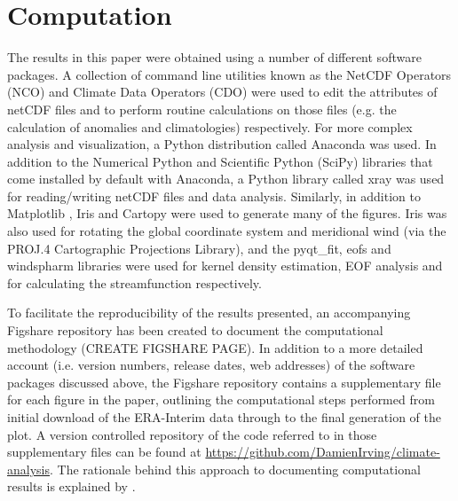 \section{Computation}

The results in this paper were obtained using a number of different software packages. A collection of command line utilities known as the NetCDF Operators (NCO) and Climate Data Operators (CDO) were used to edit the attributes of netCDF files and to perform routine calculations on those files (e.g. the calculation of anomalies and climatologies) respectively. For more complex analysis and visualization, a Python distribution called Anaconda was used. In addition to the Numerical Python \citep[NumPy;][]{VanDerWalt2011} and Scientific Python (SciPy) libraries that come installed by default with Anaconda, a Python library called xray was used for reading/writing netCDF files and data analysis. Similarly, in addition to Matplotlib \citep[the default Python plotting library;][]{Hunter2007}, Iris and Cartopy were used to generate many of the figures. Iris was also used for rotating the global coordinate system and meridional wind (via the PROJ.4 Cartographic Projections Library), and the pyqt_fit, eofs and windspharm libraries were used for kernel density estimation, EOF analysis and for calculating the streamfunction respectively.

To facilitate the reproducibility of the results presented, an accompanying Figshare repository has been created to document the computational methodology (CREATE FIGSHARE PAGE). In addition to a more detailed account (i.e. version numbers, release dates, web addresses) of the software packages discussed above, the Figshare repository contains a supplementary file for each figure in the paper, outlining the computational steps performed from initial download of the ERA-Interim data through to the final generation of the plot. A version controlled repository of the code referred to in those supplementary files can be found at \url{https://github.com/DamienIrving/climate-analysis}. The rationale behind this approach to documenting computational results is explained by \citet{Irving2015}.